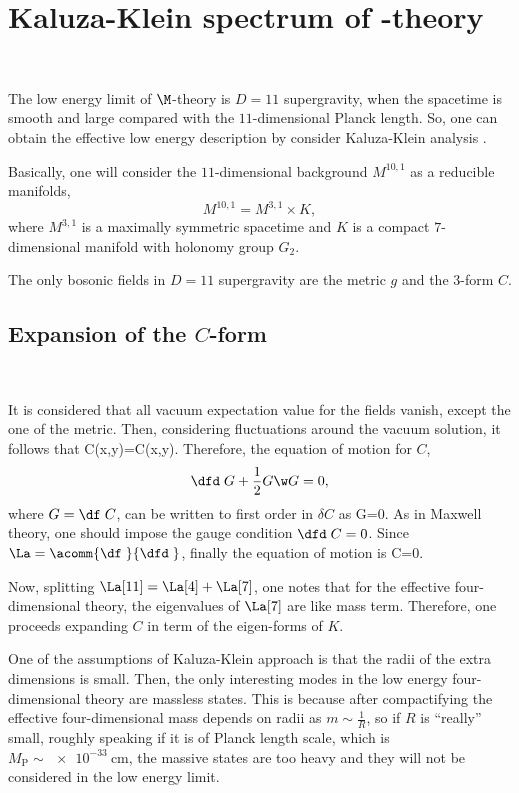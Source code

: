 \section{Kaluza-Klein spectrum of \M-theory}\

The low energy limit of $\M$-theory is $D=11$ supergravity, when  the spacetime is smooth and large compared with the $11$-dimensional Planck length. So, one can obtain the effective low energy description by consider Kaluza-Klein analysis \cite{Papadopoulos:1995da,Acharya:2004qe}. 

Basically, one will consider the $11$-dimensional background $M^{10,1}$ as a reducible manifolds, $$M^{10,1}=M^{3,1}\times K,$$where $M^{3,1}$ is a maximally symmetric spacetime and $K$ is a compact $7$-dimensional manifold with holonomy group $G_2$.

The only bosonic fields in $D=11$ supergravity are the metric $g$ and the $3$-form $C$. 

\subsection{Expansion of the $C$-form}\

It is  considered that all vacuum expectation value for  the fields vanish, except the one of the metric. Then, considering fluctuations around the vacuum solution, it follows that
\beq
C(x,y)=\delta C(x,y).
\eeq
Therefore, the equation of motion for $C$, 
\begin{align}
  \dfd\;G+\frac{1}{2}G\w G=0,\label{eq:C}
\end{align}
where $G=\df\;C$, can be written to first order in $\delta C$ as
\beq
\dfd \;G=0.
\eeq
As in Maxwell theory, one should impose the gauge condition $\dfd\;C=0$. Since $\La=\acomm{\df\;}{\dfd\;}$, finally the equation of motion is
\beq
\La[11] C=0.
\eeq

Now, splitting $\La[11]=\La[4]+\La[7]$, one notes that for the effective four-dimensional theory, the eigenvalues of $\La[7]$ are like  mass term. Therefore, one proceeds  expanding $C$ in term of the eigen-forms of $K$.

One of the  assumptions of Kaluza-Klein approach is that %
the radii of the extra dimensions is small. Then, the only interesting modes in the low energy four-dimensional theory are  massless states. This is because after compactifying the effective four-dimensional mass depends on radii as $m\sim \frac{1}{R}$, so if $R$ is ``really'' small, roughly speaking if it is of Planck length scale, which is $M_{\text{P}}\sim\SI{e-33}{\cm}$, the massive states are too heavy and they will not be considered in the low energy limit.

